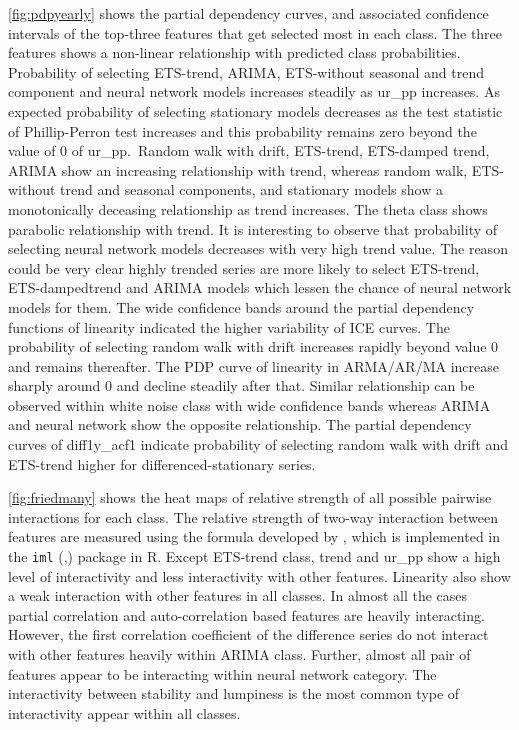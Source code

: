 \documentclass[11pt,a4paper,]{article}
\begin{document}
\autoref{fig:pdpyearly} shows the partial dependency curves, and
associated confidence intervals of the top-three features that get
selected most in each class. The three features shows a non-linear
relationship with predicted class probabilities. Probability of
selecting ETS-trend, ARIMA, ETS-without seasonal and trend component and
neural network models increases steadily as ur\_pp increases. As
expected probability of selecting stationary models decreases as the
test statistic of Phillip-Perron test increases and this probability
remains zero beyond the value of 0 of ur\_pp.~Random walk with drift,
ETS-trend, ETS-damped trend, ARIMA show an increasing relationship with
trend, whereas random walk, ETS-without trend and seasonal components,
and stationary models show a monotonically deceasing relationship as
trend increases. The theta class shows parabolic relationship with
trend. It is interesting to observe that probability of selecting neural
network models decreases with very high trend value. The reason could be
very clear highly trended series are more likely to select ETS-trend,
ETS-dampedtrend and ARIMA models which lessen the chance of neural
network models for them. The wide confidence bands around the partial
dependency functions of linearity indicated the higher variability of
ICE curves. The probability of selecting random walk with drift
increases rapidly beyond value 0 and remains thereafter. The PDP curve
of linearity in ARMA/AR/MA increase sharply around 0 and decline
steadily after that. Similar relationship can be observed within white
noise class with wide confidence bands whereas ARIMA and neural network
show the opposite relationship. The partial dependency curves of
diff1y\_acf1 indicate probability of selecting random walk with drift
and ETS-trend higher for differenced-stationary series.

\autoref{fig:friedmany} shows the heat maps of relative strength of all
possible pairwise interactions for each class. The relative strength of
two-way interaction between features are measured using the formula
developed by \textcite{friedman2008predictive}, which is implemented in
the \texttt{iml} (\textcite{molnar2018iml},) package in R. Except
ETS-trend class, trend and ur\_pp show a high level of interactivity and
less interactivity with other features. Linearity also show a weak
interaction with other features in all classes. In almost all the cases
partial correlation and auto-correlation based features are heavily
interacting. However, the first correlation coefficient of the
difference series do not interact with other features heavily within
ARIMA class. Further, almost all pair of features appear to be
interacting within neural network category. The interactivity between
stability and lumpiness is the most common type of interactivity appear
within all classes.
\end{document}
